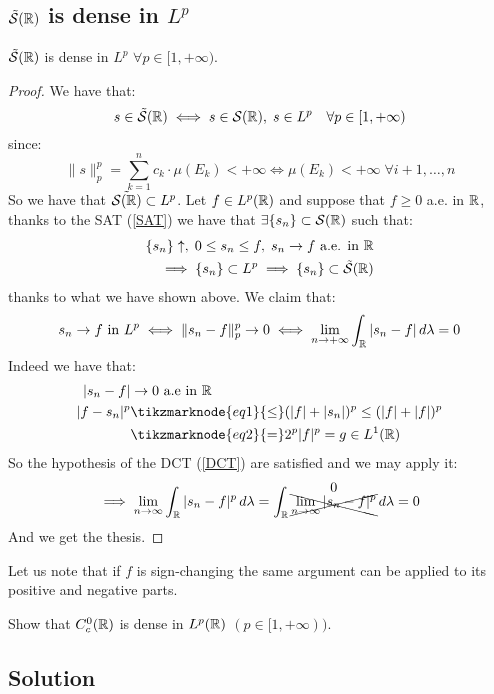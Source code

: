 \subsection{\texorpdfstring{$\tilde{\mathcal{S}}(\mathbb{R})$}{The set of simple functions with support of finite measure} is dense in \texorpdfstring{$L^p$}{Lp}}
$\tilde{\mathcal{S}}(\mathbb{R})$ is dense in $L^p$ $\forall p\in[1,+\infty)$.

\begin{proof}
    We have that:
    \[ s\in\tilde{\mathcal{S}}(\mathbb{R}) \iff s\in\mathcal{S}(\mathbb{R}), \; s\in L^p \quad \forall p \in [1,+\infty) \]
    since: %
    \[ \|s\|_p^p = \sum_{k=1}^n c_k \cdot \mu(E_k) < +\infty \iff \mu(E_k) < +\infty \; \forall i +1, \dots, n \]
    So we have that $\tilde{\mathcal{S}(\mathbb{R})} \subset L^p$. Let $f\in L^p(\mathbb{R})$ and suppose that $f\geq0$ a.e. in $\mathbb{R}$, thanks to the SAT (\ref{SAT}) we have that $\exists \{ s_n \} \subset \mathcal{S}(\mathbb{R})$ such that:
    \begin{align*}
        \{ s_n \} \uparrow, \; 0 \leq s_n \leq f, \; s_n\to f \text{ a.e. in } \mathbb{R} \\
        \implies \{ s_n \} \subset L^p \implies \{ s_n \} \subset \tilde{\mathcal{S}}(\mathbb{R})
    \end{align*}
    thanks to what we have shown above.
    We claim that:
    \[ s_n \to f \text{ in } L^p \iff \|s_n-f\|_p^p \to 0 \iff \lim_{n\to+\infty} \int_{\mathbb{R}} |s_n-f| \, d\lambda = 0 \]
    Indeed we have that:
    \begin{align*}
        |s_n-f| & \to 0 \text{ a.e in } \R \\
        | f- s_n|^p & \tikzmarknode{eq1}{\leq} (|f| + |s_n|)^p \leq (|f|+|f|)^p \\
        & \tikzmarknode{eq2}{=} 2^p |f|^p = g\in L^1(\R)
    \end{align*} %
    So the hypothesis of the DCT (\ref{DCT}) are satisfied and we may apply it:
    \[ \implies \lim_{n\to\infty} \int_{\mathbb{R}} |s_n-f|^p \, d\lambda = \int_{\mathbb{R}} \overset{\text{\normalsize0}}{\xcancel{\lim_{n\to\infty} |s_n-f|^p}} \, d\lambda = 0 \]
    And we get the thesis.
\end{proof}
Let us note that if $f$ is sign-changing the same argument can be applied to its positive and negative parts.


\question
Show that $C^0_c(\mathbb{R})$ is dense in $L^p(\mathbb{R})$ $(p \in [1, +\infty))$.

\subsection*{Solution}

